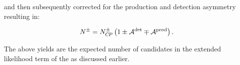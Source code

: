 \noindent and then subsequently corrected for the production and detection asymmetry resulting in:

\begin{equation}
N^{\pm} = N^{\pm}_{C\!P}  \left( 1 \pm \mathcal{A}^{\text{det}} \mp \mathcal{A}^{\text{prod}} \right).
\label{norm_yields}
\end{equation}

\noindent The above yields are the expected number of candidates in the extended likelihood term of the \pdfs as discussed earlier.
